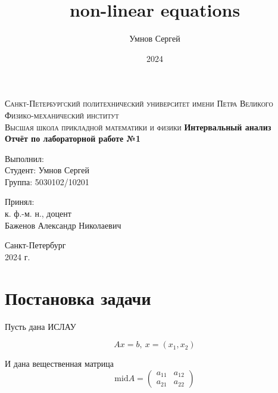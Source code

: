 \documentclass[a4paper,14pt]{article}
\title{non-linear equations}
\author{Умнов Сергей}
\date{2024}
\begin{document}
	
	\begin{titlepage}
		\begin{center}
			\textsc{
				Санкт-Петербургский политехнический университет имени Петра Великого \\[5mm]
				Физико-механический институт\\[2mm]
				Высшая школа прикладной математики и физики            
			}   
			\vfill
			\textbf{\large
				Интервальный анализ\\
				Отчёт по лабораторной работе №1 \\[3mm]
			}                
		\end{center}
		
		\vfill
		\hfill
		\begin{minipage}{0.5\textwidth}
			Выполнил: \\[2mm]   
			Студент: Умнов Сергей \\
			Группа: 5030102/10201\\
		\end{minipage}
		
		\hfill
		\begin{minipage}{0.5\textwidth}
			Принял: \\[2mm]
			к. ф.-м. н., доцент \\   
			Баженов Александр Николаевич
		\end{minipage}
		
		\vfill
		\begin{center}
			Санкт-Петербург \\2024 г.
		\end{center}
	\end{titlepage}
	
	\tableofcontents
	\newpage
	
	\section{Постановка задачи}
	Пусть дана ИСЛАУ

	\[
		Ax = b, \ x = (x_1, x_2)
	\]

	И дана вещественная матрица
	\begin{equation}\text{mid} A = 
		\begin{pmatrix}
			a_{11} & a_{12}\\ 
			a_{21} & a_{22}
		\end{pmatrix}
	\end{equation}
\end{document}
